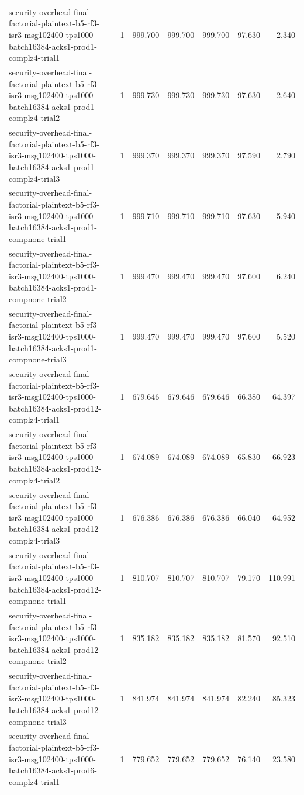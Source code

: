 \begin{tabular}{lrrrrrr}
security-overhead-final-factorial-plaintext-b5-rf3-isr3-msg102400-tps1000-batch16384-acks1-prod1-complz4-trial1 & 1 & 999.700 & 999.700 & 999.700 & 97.630 & 2.340 \\
security-overhead-final-factorial-plaintext-b5-rf3-isr3-msg102400-tps1000-batch16384-acks1-prod1-complz4-trial2 & 1 & 999.730 & 999.730 & 999.730 & 97.630 & 2.640 \\
security-overhead-final-factorial-plaintext-b5-rf3-isr3-msg102400-tps1000-batch16384-acks1-prod1-complz4-trial3 & 1 & 999.370 & 999.370 & 999.370 & 97.590 & 2.790 \\
security-overhead-final-factorial-plaintext-b5-rf3-isr3-msg102400-tps1000-batch16384-acks1-prod1-compnone-trial1 & 1 & 999.710 & 999.710 & 999.710 & 97.630 & 5.940 \\
security-overhead-final-factorial-plaintext-b5-rf3-isr3-msg102400-tps1000-batch16384-acks1-prod1-compnone-trial2 & 1 & 999.470 & 999.470 & 999.470 & 97.600 & 6.240 \\
security-overhead-final-factorial-plaintext-b5-rf3-isr3-msg102400-tps1000-batch16384-acks1-prod1-compnone-trial3 & 1 & 999.470 & 999.470 & 999.470 & 97.600 & 5.520 \\
security-overhead-final-factorial-plaintext-b5-rf3-isr3-msg102400-tps1000-batch16384-acks1-prod12-complz4-trial1 & 1 & 679.646 & 679.646 & 679.646 & 66.380 & 64.397 \\
security-overhead-final-factorial-plaintext-b5-rf3-isr3-msg102400-tps1000-batch16384-acks1-prod12-complz4-trial2 & 1 & 674.089 & 674.089 & 674.089 & 65.830 & 66.923 \\
security-overhead-final-factorial-plaintext-b5-rf3-isr3-msg102400-tps1000-batch16384-acks1-prod12-complz4-trial3 & 1 & 676.386 & 676.386 & 676.386 & 66.040 & 64.952 \\
security-overhead-final-factorial-plaintext-b5-rf3-isr3-msg102400-tps1000-batch16384-acks1-prod12-compnone-trial1 & 1 & 810.707 & 810.707 & 810.707 & 79.170 & 110.991 \\
security-overhead-final-factorial-plaintext-b5-rf3-isr3-msg102400-tps1000-batch16384-acks1-prod12-compnone-trial2 & 1 & 835.182 & 835.182 & 835.182 & 81.570 & 92.510 \\
security-overhead-final-factorial-plaintext-b5-rf3-isr3-msg102400-tps1000-batch16384-acks1-prod12-compnone-trial3 & 1 & 841.974 & 841.974 & 841.974 & 82.240 & 85.323 \\
security-overhead-final-factorial-plaintext-b5-rf3-isr3-msg102400-tps1000-batch16384-acks1-prod6-complz4-trial1 & 1 & 779.652 & 779.652 & 779.652 & 76.140 & 23.580 \\

\end{tabular}
